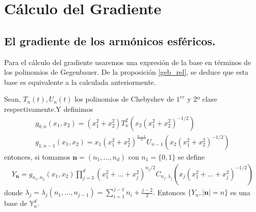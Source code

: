 \label{ch:gradiente}
\chapter[Cálculo del Gradiente]
		{Cálculo del Gradiente}
\section{El gradiente de los armónicos esféricos.}
Para el cálculo del gradiente usaremos una expresión de la base en términos de los polinomios de Gegenbauer. De la proposición \hyperref[]{\ref{geb_rel}}, se deduce que esta base es equivalente a la calculada anteriormente.
\\
\begin{thm}
Sean, $T_{n}(t),U_{n}(t)$ los polinomios de Chebyshev de $1^{er}$ y 2º clase respectivamente.Y definimos
\begin{gather*}
 g_{0,n}(x_1,x_2) = (x_1^2+x_2^2)T_n^2(x_2(x_1^2+x_2^2)^{-1/2})
\\
g_{1,n-1}(x_1,x_2) = x_1(x_1^2+x_2^2)^{\frac{n-1}{2}}U_{n-1}(x_2(x_1^2+x_2^2)^{-1/2})
\end{gather*}
entonces, si tomamos $\textbf{n}=(n_1,...,n_d)$ con $n_1 = \{0,1\}$ se define
\begin{gather*}
Y_\textbf{n} = g_{n_1,n_2}(x_1,x_2)\prod_{j=3}^{d}(x_1^2+...+x_j^2)^{n_j/2}C_{n_j,\lambda_j}(x_j(x_1^2+...+x_j^2)^{-1/2})
\end{gather*}
donde $\lambda_j =\lambda_j(n_1,...,n_{j-1}) = \sum_{i=1}^{j-1}n_i + \frac{j-2}{2}$. Entonces $\{Y_n,|\textbf{n}|=n\}$ es una base de $\mathds{Y}_{n}^{d}$.
\end{thm}
\medskip

